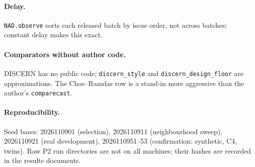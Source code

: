 \paragraph{Delay.} \texttt{NAD.observe} sorts each released batch by issue order, not across batches;
constant delay makes this exact.

\paragraph{Comparators without author code.} DISCERN has no public code; \texttt{discern\_style} and
\texttt{discern\_design\_floor} are approximations. The Choe--Ramdas row is a stand-in more aggressive
than the author's \texttt{comparecast}.

\paragraph{Reproducibility.} Seed bases: 2026110901 (selection), 2026110911 (neighbourhood sweep),
2026110921 (real development), 2026110951--53 (confirmation: synthetic, C4, twins). Raw P2 run
directories are not on all machines; their hashes are recorded in the results documents.
